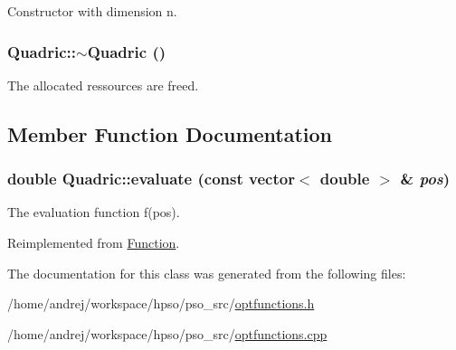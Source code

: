 Constructor with dimension n. 

\hypertarget{classQuadric_4550e4e9eee3832eda3cbac34829e2dd}{
\subsubsection{\setlength{\rightskip}{0pt plus 5cm}Quadric::$\sim$Quadric ()}}
\label{classQuadric_4550e4e9eee3832eda3cbac34829e2dd}


The allocated ressources are freed. 



\subsection{Member Function Documentation}
\hypertarget{classQuadric_897b3e96e1f1223bf0b2b9fdce32698d}{
\subsubsection{\setlength{\rightskip}{0pt plus 5cm}double Quadric::evaluate (const vector$<$ double $>$ \& {\em pos})}}
\label{classQuadric_897b3e96e1f1223bf0b2b9fdce32698d}


The evaluation function f(pos). 



Reimplemented from \hyperlink{classFunction_159260a1fc3afa8932491e4057b6b844}{Function}.

The documentation for this class was generated from the following files:\begin{CompactItemize}
\item 
/home/andrej/workspace/hpso/pso\_\-src/\hyperlink{optfunctions_8h}{optfunctions.h}\item 
/home/andrej/workspace/hpso/pso\_\-src/\hyperlink{optfunctions_8cpp}{optfunctions.cpp}\end{CompactItemize}
